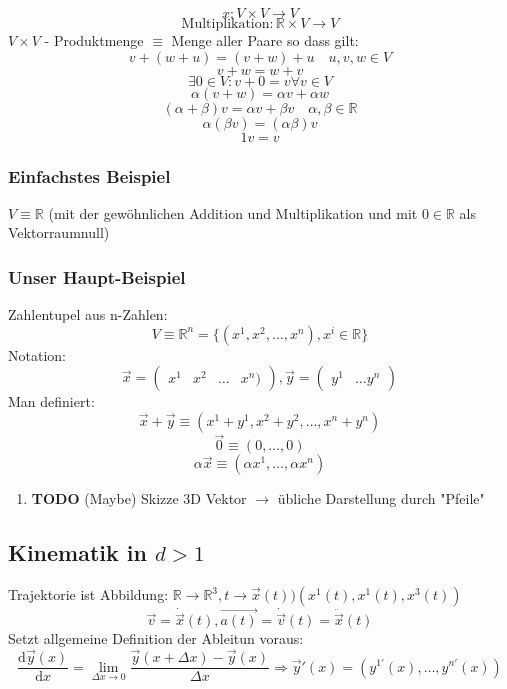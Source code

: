 \documentclass[11pt]{article}
\DeclareMathOperator{\Forall}{\forall}
\begin{document}
\[x : V\times V \rightarrow V\]
\[\text{Multiplikation}: \mathbb{R}\times V \rightarrow V\]
$V\times V$ - Produktmenge $\equiv$ Menge aller Paare
so dass gilt:
\[v + (w + u) = (v + w) + u\quad u,v,w\in V\tag*{Assoziativität}\]
\[v+w = w+v\tag*{Kommutativität}\]
\[\exists 0 \in V: v + 0 = v \Forall v\in V\tag*{Null}\]
\[\alpha(v+w) = \alpha v + \alpha w \tag*{Distributvität}\]
\[(\alpha + \beta)v = \alpha v + \beta v \quad \alpha,\beta \in \mathbb{R}\tag*{Distributivität}\]
\[\alpha(\beta v) = (\alpha\beta) v\tag*{Assoziativität der Multiplikation}\]
\[1 v = v \tag*{Multiplikation mit Eins}\]
\subsubsection{Einfachstes Beispiel}
\label{sec-1-4-1}
$V\equiv \mathbb{R}$ (mit der gewöhnlichen Addition und Multiplikation und mit $0\in\mathbb{R}$ als Vektorraumnull)
\subsubsection{Unser Haupt-Beispiel}
\label{sec-1-4-2}
Zahlentupel aus n-Zahlen:
\[V\equiv \mathbb{R}^n = \{(x^1,x^2,\ldots,x^n), x^i \in\mathbb{R}\}\]
Notation:
\[\vec{x} = \begin{pmatrix} x^1& x^2 & \ldots & x^n)\end{pmatrix}, \vec{y} = \begin{pmatrix} y^1 & \ldots y^n \end{pmatrix}\]
Man definiert:
\[\vec{x} + \vec{y} \equiv (x^1 + y^1, x^2 + y^2, \ldots, x^n + y^n)\]
\[\vec{0} \equiv (0,\ldots,0)\]
\[\alpha \vec{x} \equiv (\alpha x^1, \ldots, \alpha x^n)\]
\begin{enumerate}
\item {\bfseries\sffamily TODO} (Maybe) Skizze 3D Vektor
\label{sec-1-4-2-1}
$\rightarrow$ übliche Darstellung durch "Pfeile"
\end{enumerate}
\subsection{Kinematik in $d>1$}
\label{sec-1-5}
Trajektorie ist Abbildung: $\mathbb{R} \to \mathbb{R}^3, t\to \vec{x}(t) ) (x^1(t),x^1(t),x^3(t))$
\[\vec{v} = \dot{\vec{x}}(t), \vec{a(t)} = \dot{\vec{v}}(t) = \ddot{\vec{x}}(t)\]
Setzt allgemeine Definition der Ableitun voraus:
\[\frac{\mathrm{d}\vec{y}(x)}{\mathrm{d}x} = \lim_{\Delta x \to 0} \frac{\vec{y}(x + \Delta x) - \vec{y}(x)}{\Delta x}  \Rightarrow \vec{y}'(x) = (y^{1'}(x), \ldots,y^{n'}(x))\]
\end{document}
